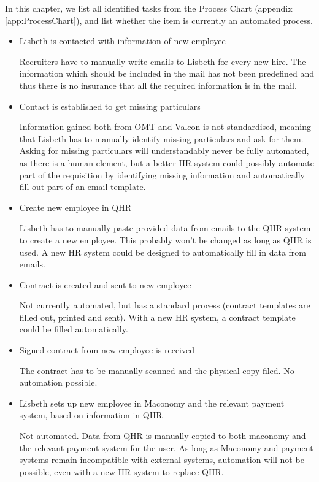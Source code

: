 In this chapter, we list all identified tasks from the Process Chart (appendix \ref*{app:ProcessChart}), and list whether the item is currently an automated process. 

\begin{itemize}
	\item{Lisbeth is contacted with information of new employee}
	
		Recruiters have to manually write emails to Lisbeth for every new hire. The information which should be included in the mail has not been predefined and thus there is no insurance that all the required information is in the mail.
		
	\item{Contact is established to get missing particulars}
	
		Information gained both from OMT and Valcon is not standardised, meaning that Lisbeth has to manually identify missing particulars and ask for them. Asking for missing particulars will understandably never be fully automated, as there is a human element, but a better HR system could possibly automate part of the requisition by identifying missing information and automatically fill out part of an email template.
		
	\item{Create new employee in QHR}
	
		Lisbeth has to manually paste provided data from emails to the QHR system to create a new employee. This probably won't be changed as long as QHR is used. A new HR system could be designed to automatically fill in data from emails.
	
	\item{Contract is created and sent to new employee}
	
		Not currently automated, but has a standard process (contract templates are filled out, printed and sent).
		With a new HR system, a contract template could be filled automatically.
	
	\item{Signed contract from new employee is received}
	
		The contract has to be manually scanned and the physical copy filed. No automation possible.
	
	\item{Lisbeth sets up new employee in Maconomy and the relevant payment system, based on information in QHR}
	
		Not automated. Data from QHR is manually copied to both maconomy and the relevant payment system for the user.
		As long as Maconomy and payment systems remain incompatible with external systems, automation will not be possible, even with a new HR system to replace QHR.
	

\end{itemize}
